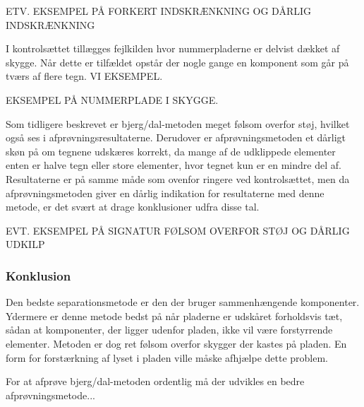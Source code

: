 ETV. EKSEMPEL PÅ FORKERT INDSKRÆNKNING OG DÅRLIG INDSKRÆNKNING

I kontrolsættet tillægges fejlkilden hvor nummerpladerne er delvist dækket af skygge. Når dette er tilfældet opstår der nogle gange en komponent som går på tværs af flere tegn. VI EKSEMPEL.

EKSEMPEL PÅ NUMMERPLADE I SKYGGE.

Som tidligere beskrevet er bjerg/dal-metoden meget følsom overfor støj, hvilket også ses i afprøvningsresultaterne. Derudover er afprøvningsmetoden et dårligt skøn på om tegnene udskæres korrekt, da mange af de udklippede elementer enten er halve tegn eller store elementer, hvor tegnet kun er en mindre del af. Resultaterne er på samme måde som ovenfor ringere ved kontrolsættet, men da afprøvningsmetoden giver en dårlig indikation for resultaterne med denne metode, er det svært at drage konklusioner udfra disse tal.

EVT. EKSEMPEL PÅ SIGNATUR FØLSOM OVERFOR STØJ OG DÅRLIG UDKILP

\subsubsection{Konklusion}

Den bedste separationsmetode er den der bruger sammenhængende komponenter. Ydermere er denne metode bedst på når pladerne er udskåret forholdsvis tæt, sådan at komponenter, der ligger udenfor pladen, ikke vil være forstyrrende elementer. Metoden er dog ret følsom overfor skygger der kastes på pladen. En form for forstærkning af lyset i pladen ville måske afhjælpe dette problem.

For at afprøve bjerg/dal-metoden ordentlig må der udvikles en bedre afprøvningsmetode...

\begin{comment}
Problemer ved 10: tegn der er smeltet sammen pga. søm skruer: OE26906 og ----290. Godt udskåret: UX33152, skæve plader et problem. go kontrast: YE39734.

Problemer ved 20: for stort område giver komponenter der ikke klippes bort, fordi kontrastforstærkning giver et andet resultat, her ville dynamisk kontrast-blok størrelse måske hjælpe. Dårlig indskrænk XK29750. TS57793: GOD(?) 

Problemer ve 30: stadig for stort område: giver komponenter udenfor der vælges. dårlig indskrænk, især foran? eksempler.

\end{comment}


